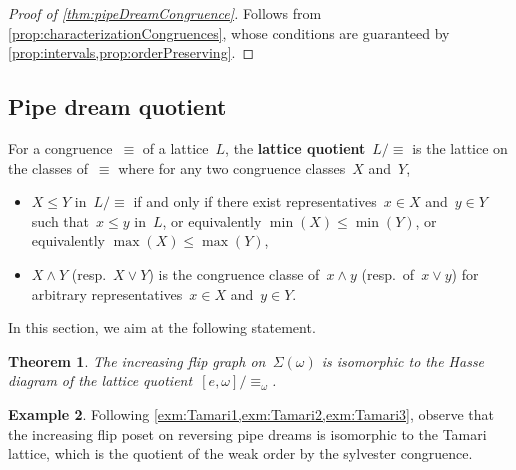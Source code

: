 \documentclass{amsart}
\newtheorem{theorem}{Theorem}[section]
\theoremstyle{definition}
\newtheorem{example}[theorem]{Example}
\newcommand{\defn}[1]{\textbf{\textsf{\color{PineGreen} #1}}} %
\newcommand{\acyclicPipeDreams}{\Sigma} %
\newcommand{\meet}{\wedge} %
\newcommand{\join}{\vee} %
\begin{document}
\begin{proof}[Proof of \cref{thm:pipeDreamCongruence}]
Follows from \cref{prop:characterizationCongruences}, whose conditions are guaranteed by \cref{prop:intervals,prop:orderPreserving}.
\end{proof}


\subsection{Pipe dream quotient}
\label{subsec:}

For a congruence~$\equiv$ of a lattice~$L$, the \defn{lattice quotient}~$L/{\equiv}$ is the lattice on the classes of~$\equiv$ where for any two congruence classes~$X$ and~$Y$, 
\begin{itemize}
\item $X \le Y$ in~$L/{\equiv}$ if and only if there exist representatives~$x \in X$ and~$y \in Y$ such that~$x \le y$ in~$L$, or equivalently $\min(X) \le \min(Y)$, or equivalently $\max(X) \le \max(Y)$,
\item $X \meet Y$ (resp.~$X \join Y$) is the congruence classe of~$x \meet y$ (resp.~of~$x \join y$) for arbitrary representatives~$x \in X$ and~$y \in Y$.
\end{itemize}
In this section, we aim at the following statement.

\begin{theorem}
\label{thm:pipeDreamQuotient}
The increasing flip graph on~$\acyclicPipeDreams(\omega)$ is isomorphic to the Hasse diagram of the lattice quotient~$[e,\omega]/{\equiv_\omega}$.
\end{theorem}

\begin{example}
\label{exm:Tamari4}
Following \cref{exm:Tamari1,exm:Tamari2,exm:Tamari3}, observe that the increasing flip poset on reversing pipe dreams is isomorphic to the Tamari lattice, which is the quotient of the weak order by the sylvester congruence.
\end{example}
\end{document}
